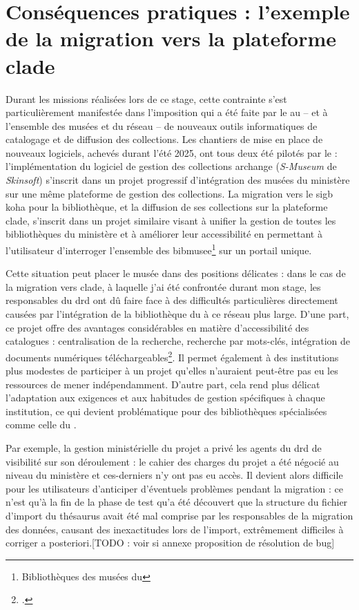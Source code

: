 \section{\label{I-B-2}Conséquences pratiques : l'exemple de la migration vers la plateforme \acs{clade}}

Durant les missions réalisées lors de ce stage, cette contrainte s'est particulièrement manifestée dans l'imposition qui a été faite par le \minarm au \mae -- et à l'ensemble des musées et \bibmusee du réseau -- de nouveaux outils informatiques de catalogage et de diffusion des collections. Les chantiers de mise en place de nouveaux logiciels, achevés durant l'été 2025, ont tous deux été pilotés par le \minarm : l'implémentation du logiciel de gestion des collections \gls{archange} (\textit{S-Museum} de \textit{Skinsoft}) s'inscrit dans un projet progressif d'intégration des musées du ministère sur une même plateforme de gestion des collections. La migration vers le \ac{sigb} \gls{koha} pour la bibliothèque, et la diffusion de ses collections sur la plateforme \gls{clade}, s'inscrit dans un projet similaire visant à unifier la gestion de toutes les bibliothèques du ministère et à améliorer leur accessibilité en permettant à l'utilisateur d'interroger l'ensemble des \gls{bibmusee}\footnote{Bibliothèques des musées du \minarm} sur un portail unique.

Cette situation peut placer le musée dans des positions délicates : dans le cas de la migration vers \gls{clade}, à laquelle j'ai été confrontée durant mon stage, les responsables du \ac{drd} ont dû faire face à des difficultés particulières directement causées par l'intégration de la bibliothèque du \mae à ce réseau plus large. D'une part, ce projet offre des avantages considérables en matière d'accessibilité des catalogues : centralisation de la recherche, recherche par mots-clés, intégration de documents numériques téléchargeables\footcite{ministeredesarmeesKitCommunicationCLADE}. Il permet également à des institutions plus modestes de participer à un projet qu'elles n'auraient peut-être pas eu les ressources de mener indépendamment. D'autre part, cela rend plus délicat l'adaptation aux exigences et aux habitudes de gestion spécifiques à chaque institution, ce qui devient problématique pour des bibliothèques spécialisées comme celle du \mae.

Par exemple, la gestion ministérielle du projet a privé les agents du \ac{drd} de visibilité sur son déroulement : le cahier des charges du projet a été négocié au niveau du ministère et ces-derniers n'y ont pas eu accès. Il devient alors difficile pour les utilisateurs d'anticiper d'éventuels problèmes pendant la migration : ce n'est qu'à la fin de la phase de test qu'a été découvert que la structure du fichier d'import du thésaurus avait été mal comprise par les responsables de la migration des données, causant des inexactitudes lors de l'import, extrêmement difficiles à corriger a posteriori.[TODO : voir si annexe proposition de résolution de bug]

